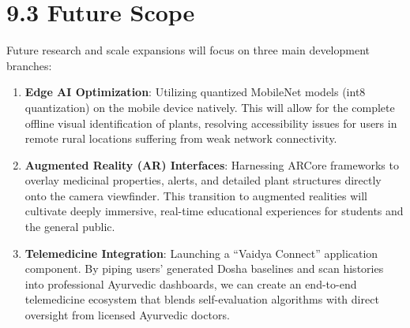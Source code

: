 \documentclass[12pt]{article}
\begin{document}
\newpage

\section*{9.3 \quad Future Scope}
\justify

Future research and scale expansions will focus on three main development branches:

\begin{enumerate}
    \item \textbf{Edge AI Optimization}: Utilizing quantized MobileNet models (int8 quantization)
    on the mobile device natively. This will allow for the complete offline visual identification
    of plants, resolving accessibility issues for users in remote rural locations suffering from
    weak network connectivity.

    \item \textbf{Augmented Reality (AR) Interfaces}: Harnessing ARCore frameworks to overlay
    medicinal properties, alerts, and detailed plant structures directly onto the camera
    viewfinder. This transition to augmented realities will cultivate deeply immersive, real-time
    educational experiences for students and the general public.

    \item \textbf{Telemedicine Integration}: Launching a ``Vaidya Connect'' application component.
    By piping users' generated Dosha baselines and scan histories into professional Ayurvedic
    dashboards, we can create an end-to-end telemedicine ecosystem that blends self-evaluation
    algorithms with direct oversight from licensed Ayurvedic doctors.
\end{enumerate}
\end{document}
